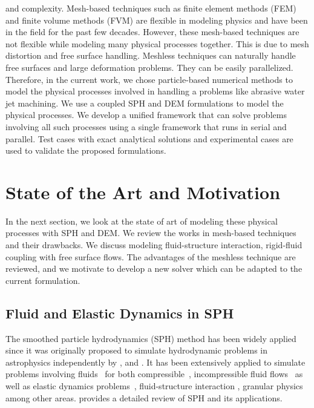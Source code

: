 and complexity. Mesh-based techniques such as finite element methods (FEM) and
finite volume methods (FVM) are flexible in modeling physics and have been in
the field for the past few decades. However, these mesh-based techniques are not
flexible while modeling many physical processes together. This is due to mesh
distortion and free surface handling. Meshless techniques can naturally handle
free surfaces and large deformation problems. They can be easily parallelized.
Therefore, in the current work, we chose particle-based numerical methods to
model the physical processes involved in handling a problems like abrasive water
jet machining. We use a coupled SPH and DEM formulations to model the physical
processes. We develop a unified framework that can solve problems involving all
such processes using a single framework that runs in serial and parallel. Test
cases with exact analytical solutions and experimental cases are used to
validate the proposed formulations.




\section{State of the Art and Motivation}
In the next section, we look at the state of art of modeling these physical
processes with SPH and DEM. We review the works in mesh-based techniques and
their drawbacks. We discuss modeling fluid-structure interaction, rigid-fluid
coupling with free surface flows. The advantages of the meshless technique are
reviewed, and we motivate to develop a new solver which can be adapted to the
current formulation.


\subsection{Fluid and Elastic Dynamics in SPH}
The smoothed particle hydrodynamics (SPH) method has been widely applied since
it was originally proposed to simulate hydrodynamic problems in astrophysics
independently by \textcite{lucy77}, and \textcite{monaghan-gingold-stars-mnras-77}. It
has been extensively applied to simulate problems involving
fluids~\parencite{dalrymple2001sph,shao2003incompressible} for both
compressible~\parencite{monaghan-review:2005}, incompressible fluid
flows~\parencite{sph:fsf:monaghan-jcp94,sph:psph:cummins-rudman:jcp:1999} as well as
elastic dynamics problems~\parencite{randles-1996,gray-ed-2001}, fluid-structure
interaction \parencite{khayyer2018enhanced,he2017coupled}, granular physics
\parencite{bui2008lagrangian,bui2021smoothed} among other areas.
\textcite{monaghan2012smoothed} provides a detailed review of SPH and its
applications.

